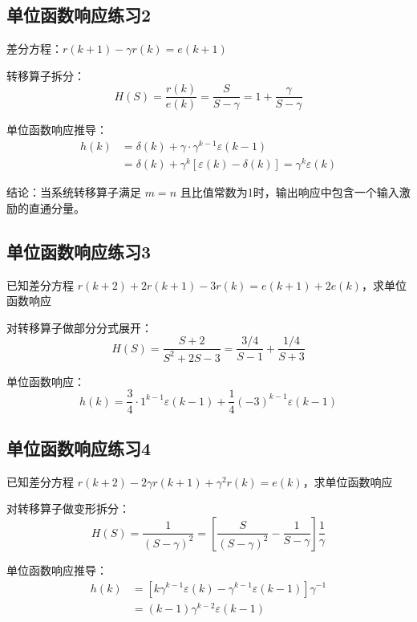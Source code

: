 \documentclass[UTF8]{ctexart}
\begin{document}
\subsection{单位函数响应练习2}

\begin{problem}
差分方程：$r(k+1)-\gamma r(k)=e(k+1)$
\end{problem}

\begin{solution}
转移算子拆分：
$$
H(S)=\frac{r(k)}{e(k)}=\frac{S}{S-\gamma}=1+\frac{\gamma}{S-\gamma}
$$

单位函数响应推导：
$$
\begin{aligned}
h(k) & =\delta(k)+\gamma \cdot \gamma^{k-1} \varepsilon(k-1) \\
& =\delta(k)+\gamma^{k}\left[\varepsilon(k)-\delta(k)\right]=\gamma^{k} \varepsilon(k)
\end{aligned}
$$

结论：当系统转移算子满足 $m=n$ 且比值常数为1时，输出响应中包含一个输入激励的直通分量。
\end{solution}

\subsection{单位函数响应练习3}

\begin{problem}
已知差分方程 $r(k+2)+2 r(k+1)-3 r(k)=e(k+1)+2 e(k)$，求单位函数响应
\end{problem}

\begin{solution}
对转移算子做部分分式展开：
$$
H(S)=\frac{S+2}{S^{2}+2 S-3}=\frac{3 / 4}{S-1}+\frac{1 / 4}{S+3}
$$

单位函数响应：
$$
h(k)=\frac{3}{4} \cdot 1^{k-1} \varepsilon(k-1)+\frac{1}{4}(-3)^{k-1} \varepsilon(k-1)
$$
\end{solution}

\subsection{单位函数响应练习4}

\begin{problem}
已知差分方程 $r(k+2)-2 \gamma r(k+1)+\gamma^{2} r(k)=e(k)$，求单位函数响应
\end{problem}

\begin{solution}
对转移算子做变形拆分：
$$
H(S)=\frac{1}{(S-\gamma)^{2}}=\left[\frac{S}{(S-\gamma)^{2}}-\frac{1}{S-\gamma}\right] \frac{1}{\gamma}
$$

单位函数响应推导：
$$
\begin{aligned}
h(k) & =\left[k \gamma^{k-1} \varepsilon(k)-\gamma^{k-1} \varepsilon(k-1)\right] \gamma^{-1} \\
& =(k-1) \gamma^{k-2} \varepsilon(k-1)
\end{aligned}
$$
\end{solution}
\end{document}
